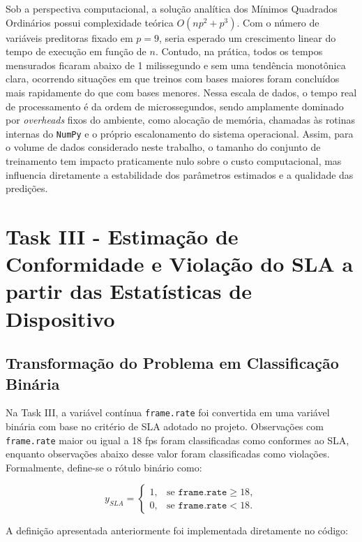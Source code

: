 \documentclass[11pt,a4paper]{article}
\begin{document}
Sob a perspectiva computacional, a solução analítica dos Mínimos Quadrados Ordinários possui complexidade teórica $O\left(np^2 + p^3\right)$. Com o número de variáveis preditoras fixado em $p=9$, seria esperado um crescimento linear do tempo de execução em função de $n$. Contudo, na prática, todos os tempos mensurados ficaram abaixo de 1 milissegundo e sem uma tendência monotônica clara, ocorrendo situações em que treinos com bases maiores foram concluídos mais rapidamente do que com bases menores. Nessa escala de dados, o tempo real de processamento é da ordem de microssegundos, sendo amplamente dominado por \emph{overheads} fixos do ambiente, como alocação de memória, chamadas às rotinas internas do \texttt{NumPy} e o próprio escalonamento do sistema operacional. Assim, para o volume de dados considerado neste trabalho, o tamanho do conjunto de treinamento tem impacto praticamente nulo sobre o custo computacional, mas influencia diretamente a estabilidade dos parâmetros estimados e a qualidade das predições.

\section{Task III - Estimação de Conformidade e Violação do SLA a partir das Estatísticas de Dispositivo}
\label{sec:taskIII}


\subsection{Transformação do Problema em Classificação Binária}

Na Task III, a variável contínua \texttt{frame.rate} foi convertida em uma variável binária com base no critério de SLA adotado no projeto. Observações com \texttt{frame.rate} maior ou igual a 18 fps foram classificadas como conformes ao SLA, enquanto observações abaixo desse valor foram classificadas como violações. Formalmente, define-se o rótulo binário como:

\begin{equation}
    y_{SLA} =
    \begin{cases}
    1, & \text{se } \texttt{frame.rate} \geq 18,\\
    0, & \text{se } \texttt{frame.rate} < 18.
    \end{cases}
\end{equation}

A definição apresentada anteriormente foi implementada diretamente no código:
\end{document}
